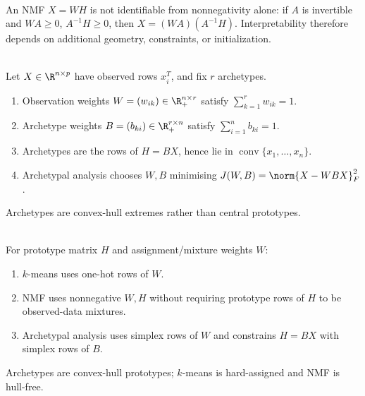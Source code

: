 \begin{remark} \label{rem:sl-nmf-nonuniqueness} \\
An NMF $X=WH$ is not identifiable from nonnegativity alone: if $A$ is invertible and $WA\geq0$, $A^{-1}H\geq0$, then $X=(WA)(A^{-1}H)$. Interpretability therefore depends on additional geometry, constraints, or initialization.
\end{remark}

\begin{definition} \label{def:sl-archetypal-analysis} \\
Let $X\in\R^{n\times p}$ have observed rows $x_i^T$, and fix $r$ archetypes.
\begin{enumerate}[label=(\roman*)]
\setlength{\itemsep}{0pt}
\item Observation weights $W=(w_{ik})\in\R_+^{n\times r}$ satisfy $\sum\limits_{k=1}^r w_{ik}=1$.
\item Archetype weights $B=(b_{ki})\in\R_+^{r\times n}$ satisfy $\sum\limits_{i=1}^n b_{ki}=1$.
\item Archetypes are the rows of $H=BX$, hence lie in $\operatorname{conv}\{x_1,\ldots,x_n\}$.
\item Archetypal analysis chooses $W,B$ minimising $J(W,B)=\norm{X-WBX}_F^2$.
\end{enumerate}
Archetypes are convex-hull extremes rather than central prototypes.
\end{definition}

\begin{remark} \label{rem:sl-archetypes-versus-kmeans-and-nmf} \\
For prototype matrix $H$ and assignment/mixture weights $W$:
\begin{enumerate}[label=(\roman*)]
\setlength{\itemsep}{0pt}
\item $k$-means uses one-hot rows of $W$.
\item NMF uses nonnegative $W,H$ without requiring prototype rows of $H$ to be observed-data mixtures.
\item Archetypal analysis uses simplex rows of $W$ and constrains $H=BX$ with simplex rows of $B$.
\end{enumerate}
Archetypes are convex-hull prototypes; $k$-means is hard-assigned and NMF is hull-free.
\end{remark}

